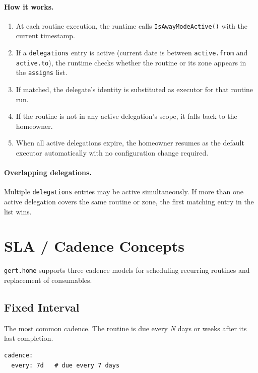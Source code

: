 \paragraph{How it works.}
\begin{enumerate}
  \item At each routine execution, the runtime calls \texttt{IsAwayModeActive()} with the
        current timestamp.
  \item If a \texttt{delegations} entry is active (current date is between \texttt{active.from}
        and \texttt{active.to}), the runtime checks whether the routine or its zone appears in
        the \texttt{assigns} list.
  \item If matched, the delegate's identity is substituted as executor for that routine run.
  \item If the routine is not in any active delegation's scope, it falls back to the homeowner.
  \item When all active delegations expire, the homeowner resumes as the default executor
        automatically with no configuration change required.
\end{enumerate}

\paragraph{Overlapping delegations.}
Multiple \texttt{delegations} entries may be active simultaneously. If more than one active
delegation covers the same routine or zone, the first matching entry in the list wins.

\section{SLA / Cadence Concepts}
\label{sec:concepts-sla}

\texttt{gert.home} supports three cadence models for scheduling recurring routines and
replacement of consumables.

\subsection{Fixed Interval}

The most common cadence. The routine is due every \textit{N} days or weeks after its last
completion.

\begin{verbatim}
cadence:
  every: 7d   # due every 7 days
\end{verbatim}

